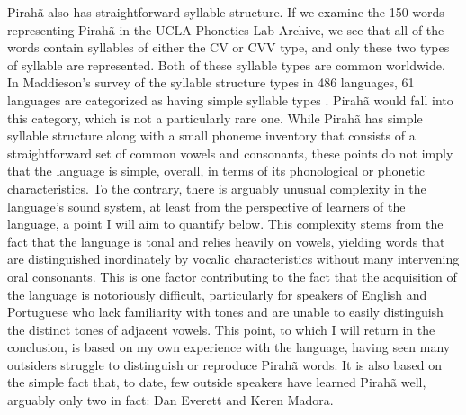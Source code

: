 \documentclass[output=paper,colorlinks,citecolor=brown
]{langscibook}
\begin{document}
    Pirahã also has straightforward syllable structure. If we examine the 150 words representing Pirahã in the UCLA Phonetics Lab Archive, we see that all of the words contain syllables of either the CV or CVV type, and only these two types of syllable are represented. Both of these syllable types are common worldwide. In Maddieson’s survey of the syllable structure types in 486 languages, 61 languages are categorized as having simple syllable types \citep{wals12}. Pirahã would fall into this category, which is not a particularly rare one. While Pirahã has simple syllable structure along with a small phoneme inventory that consists of a straightforward set of common vowels and consonants, these points do not imply that the language is simple, overall, in terms of its phonological or phonetic characteristics. To the contrary, there is arguably unusual complexity in the language’s sound system, at least from the perspective of learners of the language, a point I will aim to quantify below. This complexity stems from the fact that the language is tonal and relies heavily on vowels, yielding words that are distinguished inordinately by vocalic characteristics without many intervening oral consonants. This is one factor contributing to the fact that the acquisition of the language is notoriously difficult, particularly for speakers of English and Portuguese who lack familiarity with tones and are unable to easily distinguish the distinct tones of adjacent vowels. This point, to which I will return in the conclusion, is based on my own experience with the language, having seen many outsiders struggle to distinguish or reproduce Pirahã words. It is also based on the simple fact that, to date, few outside speakers have learned Pirahã well, arguably only two in fact: Dan Everett and Keren Madora.  
    
\end{document}
